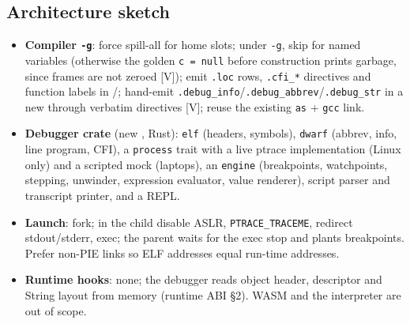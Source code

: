 \documentclass[10pt]{article}
\newcommand{\code}[1]{\texttt{\small #1}}
\newcommand{\mV}{\textsf{\scriptsize[V]}}
\begin{document}
\subsection{Architecture sketch}\label{sec:p4-arch}
\begin{itemize}
\item \textbf{Compiler \code{-g}}: force spill-all for home slots; under \code{-g}, skip  for named variables (otherwise the golden \code{c = null} before construction prints garbage, since frames are not zeroed \mV); emit \code{.loc} rows, \code{.cfi\_*} directives and function labels in /; hand-emit \code{.debug\_info}/\code{.debug\_abbrev}/\code{.debug\_str} in a new  through verbatim directives \mV; reuse the existing \code{as} + \code{gcc} link.
\item \textbf{Debugger crate} (new , Rust): \code{elf} (headers, symbols), \code{dwarf} (abbrev, info, line program, CFI), a \code{process} trait with a live ptrace implementation (Linux only) and a scripted mock (laptops), an \code{engine} (breakpoints, watchpoints, stepping, unwinder, expression evaluator, value renderer), script parser and transcript printer, and a REPL.
\item \textbf{Launch}: fork; in the child disable ASLR, \code{PTRACE\_TRACEME}, redirect stdout/stderr, exec; the parent waits for the exec stop and plants breakpoints. Prefer non-PIE links so ELF addresses equal run-time addresses.
\item \textbf{Runtime hooks}: none; the debugger reads object header, descriptor and String layout from memory (runtime ABI §2). WASM and the interpreter are out of scope.
\end{itemize}
\end{document}
